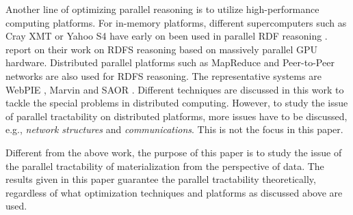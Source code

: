 Another line of optimizing parallel reasoning is to utilize high-performance computing platforms. For in-memory platforms, different supercomputers such as Cray XMT or Yahoo S4 have early on been used in parallel RDF reasoning \cite{Hoeksema2011,GoodmanJMAAH11}. \citet{HeinoP12} report on their work on RDFS reasoning based on massively parallel GPU hardware. Distributed parallel platforms such as MapReduce and Peer-to-Peer networks are also used for RDFS reasoning. The representative systems are WebPIE \cite{UrbaniKMHB12}, Marvin \cite{oren2009marvin} and SAOR \cite{HoganHP09}. Different techniques are discussed in this work to tackle the special problems in distributed computing. However, to study the issue of parallel tractability on distributed platforms,  more issues have to be discussed, e.g., \emph{network structures} and \emph{communications}. This is not the focus in this paper.

Different from the above work, the purpose of this paper is to study the issue of the parallel tractability of materialization from the perspective of data. The results given in this paper guarantee the parallel tractability theoretically, regardless of what optimization techniques and platforms as discussed above are used.




